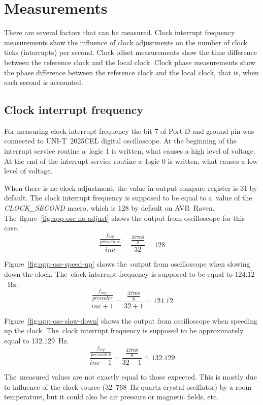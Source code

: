 
\chapter{Measurements}\label{chap:measurements}
There are several factors that can be measured.
Clock interrupt frequency measurements show the influence of clock adjustments
on the number of clock ticks (interrupts) per second.
Clock offset measurements show the time difference between the reference clock and
the local clock.
Clock phase measurements show the phase difference between the reference clock and
the local clock, that is, when each second is accounted.


\section{Clock interrupt frequency}
For measuring clock interrupt frequency the bit 7 of Port D
and ground pin was connected to UNI-T~2025CEL digital oscilloscope.
At the beginning of the interrupt service routine a~logic 1 is written,
what causes a high level of voltage.
At the end of the interrupt service routine a~logic 0 is written,
what causes a low level of voltage.

When there is no clock adjustment, the value in output compare register is 31 by default.
The clock interrupt frequency
is supposed to be equal to a~value of the {\it{CLOCK\_SECOND}} macro, which is 128 by default on AVR~Raven.
The~figure~\ref{fig:app-osc-no-adjust} shows the output from oscilloscope
for this case.
$$\frac{\frac{f_{asy}}{prescaler}}{inc} = \frac{\frac{32768}{8}}{32} = 128$$

Figure~\ref{fig:app-osc-speed-up} shows the~output from oscilloscope
when slowing down the clock.
The~clock interrupt frequency
is supposed to be equal to $124.\overline{12}$~Hz.
$$\frac{\frac{f_{asy}}{prescaler}}{inc + 1} = \frac{\frac{32768}{8}}{32+1} = 124.\overline{12}$$

Figure~\ref{fig:app-osc-slow-down} shows the output from oscilloscope
when speeding up the clock.
The~clock interrupt frequency
is supposed to be approximately equal to 132.129~Hz.
$$\frac{\frac{f_{asy}}{prescaler}}{inc - 1} = \frac{\frac{32768}{8}}{32-1} \doteq 132.129$$

The~measured values are not exactly equal to those expected.
This is mostly due to influence of the clock source
(32~768~Hz quartz crystal oscillator) by a room temperature,
but it could also be air pressure or magnetic fields, etc.


